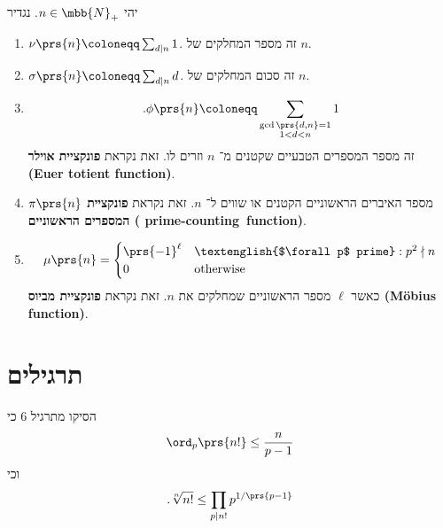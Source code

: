 \documentclass[a4paper,10pt,twoside,openany]{book}
\begin{document}
\begin{definition}
יהי
$n \in \mbb{N}_+$.
נגדיר
\begin{enumerate}
\item $\nu\prs{n} \coloneqq \sum_{d \mid n} 1$. זה מספר המחלקים של $n$.
\item $\sigma\prs{n} \coloneqq \sum_{d \mid n} d$. זה סכום המחלקים של $n$.
\item \[\text{.}\phi\prs{n} \coloneqq \sum_{\substack{\gcd\prs{d,n} = 1 \\ 1 < d < n}} 1\] זה מספר המספרים הטבעיים שקטנים מ־%
$n$
וזרים לו.
זאת נקראת
\textbf{פונקציית אוילר (\textenglish{Euer totient function})}.
\item $\pi\prs{n}$ מספר האיברים הראשוניים הקטנים או שווים ל־%
$n$.
זאת נקראת
\textbf{פונקציית המספרים הראשוניים (
\textenglish{prime-counting~function})}.
\item \[\mu\prs{n} = \begin{cases}
\prs{-1}^\ell & \text{\textenglish{$\forall p$ prime}}: p^2 \nmid n \\
0 & \text{otherwise}
\end{cases}\]
כאשר
$\ell$
מספר הראשוניים שמחלקים את
$n$.
זאת נקראת
\textbf{פונקציית מביוס (\textenglish{Möbius function})}.
\end{enumerate}
\end{definition}

\section{תרגילים}

\begin{exercisechap}
הסיקו מתרגיל 6 כי
\[\ord_p\prs{n!} \leq \frac{n}{p-1}\]
וכי
\[\text{.} \sqrt[n]{n!} \leq \prod_{p \mid n!} p^{1 / \prs{p-1}}\]
\end{exercisechap}
\end{document}
